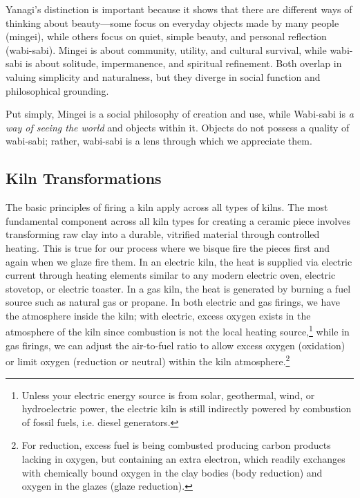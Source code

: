 \documentclass[12pt]{scrartcl}
\begin{document}
\vspace{1em}

\begin{tcolorbox}[colback=gray!10,colframe=black,title=\textbf{Why This Matters}]
Yanagi's distinction is important because it shows that there are different ways of thinking about beauty—some focus on everyday objects made by many people (mingei), while others focus on quiet, simple beauty, and personal reflection (wabi-sabi). 
Mingei is about community, utility, and cultural survival, while wabi-sabi is about solitude, impermanence, and spiritual refinement. 
Both overlap in valuing simplicity and naturalness, but they diverge in social function and philosophical grounding.

Put simply, Mingei is a social philosophy of creation and use, while Wabi-sabi is \textit{a way of seeing the world} and objects within it. Objects do not possess a quality of wabi-sabi; rather, wabi-sabi is a lens through which we appreciate them.
\end{tcolorbox}
\clearpage

{\begin{center}

\thispagestyle{noPrint}
\clearpage

\end{center}}
\thispagestyle{noPrint}
\clearpage


\subsection*{Kiln Transformations}
The basic principles of firing a kiln apply across all types of kilns.  The most fundamental component across all kiln types for creating a ceramic piece involves transforming raw clay into a durable, vitrified material through controlled heating.  This is true for our process where we bisque fire the pieces first and again when we glaze fire them.  In an electric kiln, the heat is supplied via electric current through heating elements similar to any modern electric oven, electric stovetop, or electric toaster.  In a gas kiln, the heat is generated by burning a fuel source such as natural gas or propane.  In both electric and gas firings, we have the atmosphere inside the kiln; with electric, excess oxygen exists in the atmosphere of the kiln since combustion is not the local heating source,\footnote{Unless your electric energy source is from solar, geothermal, wind, or hydroelectric power, the electric kiln is still indirectly powered by combustion of fossil fuels, i.e. diesel generators.} while in gas firings, we can adjust the air-to-fuel ratio to allow excess oxygen (oxidation) or limit oxygen (reduction or neutral) within the kiln atmosphere.\footnote{For reduction, excess fuel is being combusted producing carbon products lacking in oxygen, but containing an extra electron, which readily exchanges with chemically bound oxygen in the clay bodies (body reduction) and oxygen in the glazes (glaze reduction).}
\end{document}
